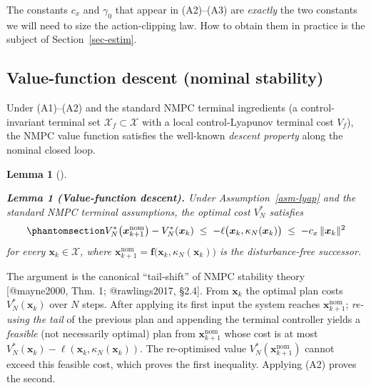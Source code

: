 \documentclass[
  11pt,
]{article}
\theoremstyle{plain}
\newtheorem{lemma}{Lemma}[section]
\theoremstyle{plain}
\theoremstyle{definition}
\theoremstyle{remark}
\begin{document}
The constants \(c_x\) and \(\gamma_0\) that appear in (A2)--(A3) are
\emph{exactly} the two constants we will need to size the
action-clipping law. How to obtain them in practice is the subject of
Section~\ref{sec-estim}.

\subsection{Value-function descent (nominal
stability)}\label{sec-vfdescent}

Under (A1)--(A2) and the standard NMPC terminal ingredients (a
control-invariant terminal set \(\mathcal{X}_f \subset \mathcal{X}\)
with a local control-Lyapunov terminal cost \(V_f\)), the NMPC value
function satisfies the well-known \emph{descent property} along the
nominal closed loop.

\begin{lemma}[]\protect\hypertarget{lem-descent}{}\label{lem-descent}

\textbf{Lemma 1 (Value-function descent).} Under
Assumption~\ref{asm-lyap} and the standard NMPC terminal assumptions,
the optimal cost \(V_N^*\) satisfies
\begin{equation}\protect\phantomsection\label{eq-descent}{
V_N^*\bigl(\bm{x}_{k+1}^{\mathrm{nom}}\bigr) - V_N^*(\bm{x}_k)
\;\le\;
-\ell\bigl(\bm{x}_k,\kappa_N(\bm{x}_k)\bigr)
\;\le\;
-c_x\,\|\bm{x}_k\|^2
}\end{equation} for every \(\bm{x}_k \in \mathcal{X}\), where
\(\bm{x}_{k+1}^{\mathrm{nom}} = \bm{f}\bigl(\bm{x}_k,\kappa_N(\bm{x}_k)\bigr)\)
is the disturbance-free successor.

\end{lemma}

\begin{tcolorbox}[enhanced jigsaw, arc=.35mm, bottomrule=.15mm, bottomtitle=1mm, breakable, colback=white, colbacktitle=quarto-callout-note-color!10!white, colframe=quarto-callout-note-color-frame, coltitle=black, left=2mm, leftrule=.75mm, opacityback=0, opacitybacktitle=0.6, rightrule=.15mm, title=\textcolor{quarto-callout-note-color}{\faInfo}\hspace{0.5em}{Proof sketch (standard)}, titlerule=0mm, toprule=.15mm, toptitle=1mm]

The argument is the canonical ``tail-shift'' of NMPC stability theory
{[}@mayne2000, Thm. 1; @rawlings2017, §2.4{]}. From \(\bm{x}_k\) the
optimal plan costs \(V_N^*(\bm{x}_k)\) over \(N\) steps. After applying
its first input the system reaches \(\bm{x}_{k+1}^{\mathrm{nom}}\);
\emph{re-using the tail} of the previous plan and appending the terminal
controller yields a \emph{feasible} (not necessarily optimal) plan from
\(\bm{x}_{k+1}^{\mathrm{nom}}\) whose cost is at most
\(V_N^*(\bm{x}_k) - \ell(\bm{x}_k,\kappa_N(\bm{x}_k))\). The
re-optimised value \(V_N^*(\bm{x}_{k+1}^{\mathrm{nom}})\) cannot exceed
this feasible cost, which proves the first inequality. Applying (A2)
proves the second.

\end{tcolorbox}
\end{document}
